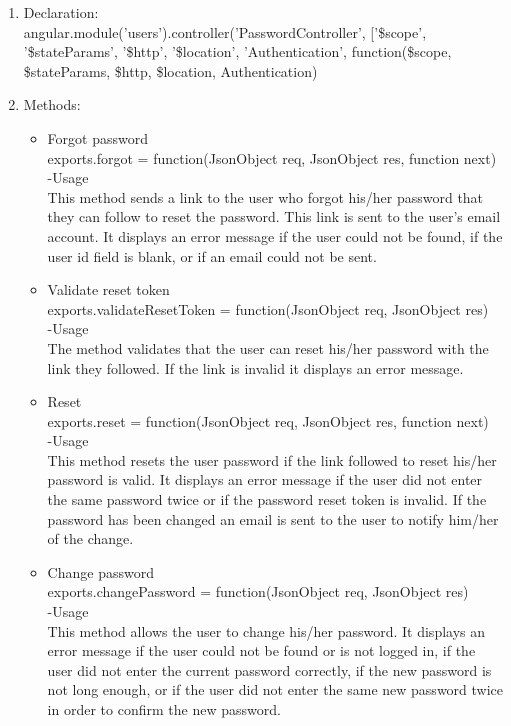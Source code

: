 \documentclass[a4paper,12pt]{article}
\begin{document}
 \begin{enumerate}
 \item Declaration:\\angular.module('users').controller('PasswordController', ['\$scope', '\$stateParams', '\$http', '\$location', 'Authentication',
	function(\$scope, \$stateParams, \$http, \$location, Authentication) 
	\item Methods:
	\begin{itemize}
	\item Forgot password\\
 exports.forgot = function(JsonObject req, JsonObject res, function next)\\
 -Usage\\
 This method sends a link to the user who forgot his/her password that they can follow to reset the password. This link is sent to the user's email account. It displays an error message if the user could not be found, if the user id field is blank, or if an email could not be sent.
 \item Validate reset token\\
 exports.validateResetToken = function(JsonObject req, JsonObject res)\\
 -Usage\\
 The method validates that the user can reset his/her password with the link they followed. If the link is invalid it displays an error message.\\
 \item Reset\\
 exports.reset = function(JsonObject req, JsonObject res, function next)\\
 -Usage\\
 This method resets the user password if the link followed to reset his/her password is valid. It displays an error message if the user did not enter the same password twice or if the password reset token is invalid. If the password has been changed an email is sent to the user to notify him/her of the change.
 \item Change password\\
 exports.changePassword = function(JsonObject req, JsonObject res)\\
 -Usage\\
 This method allows the user to change his/her password. It displays an error message if the user could not be found or is not logged in, if the user did not enter the current password correctly, if the new password is not long enough, or if the user did not enter the same new password twice in order to confirm the new password.
	\end{itemize}
 \end{enumerate}
\end{document}

